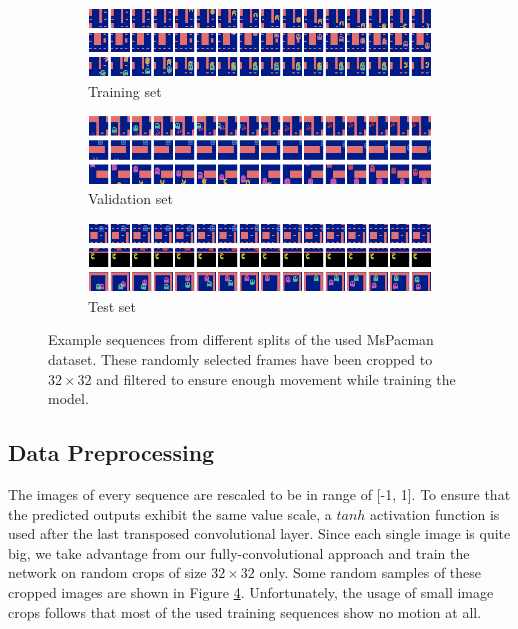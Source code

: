 \begin{figure}[htb]
\centering
\begin{subfigure}{1.0\textwidth}
  \centering
  \includegraphics[width=1.0\linewidth]{figures/ds/pac_train.png}
  \caption{Training set}
  \label{fig:pac_train}
  \vspace{.1cm}
\end{subfigure}
\begin{subfigure}{1.0\textwidth}
  \centering
  \includegraphics[width=1.0\linewidth]{figures/ds/pac_valid.png}
  \caption{Validation set}
  \label{fig:pac_valid}
  \vspace{.1cm}
\end{subfigure}
\begin{subfigure}{1.0\textwidth}
  \centering
  \includegraphics[width=1.0\linewidth]{figures/ds/pac_test.png}
  \caption{Test set}
  \label{fig:pac_test}
\end{subfigure}
\caption[MsPacman Crop Image Samples]{Example sequences from different splits of the used MsPacman dataset. These randomly selected frames have been cropped to $32 \times 32 $ and filtered to ensure enough movement while training the model.}
\label{fig:pacman}
\end{figure}


\subsection{Data Preprocessing} \label{sec:pacman_preprocessing}

The images of every sequence are rescaled to be in range of [-1, 1]. To ensure that the predicted outputs exhibit the same value scale, a $tanh$ activation function is used after the last transposed convolutional layer. Since each single image is quite big, we take advantage from our fully-convolutional approach and train the network on random crops of size $ 32 \times 32 $ only. Some random samples of these cropped images are shown in Figure \ref{fig:pacman}. Unfortunately, the usage of small image crops follows that most of the used training sequences show no motion at all.

